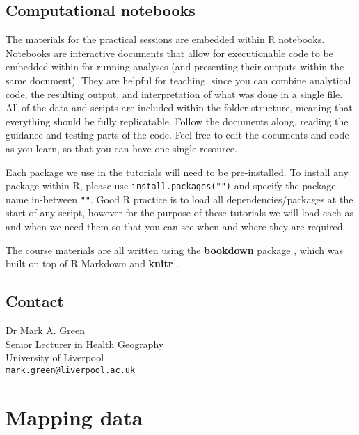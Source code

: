 \documentclass[
]{book}
\begin{document}
\hypertarget{computational-notebooks}{%
\section*{Computational notebooks}\label{computational-notebooks}}

The materials for the practical sessions are embedded within R notebooks. Notebooks are interactive documents that allow for executionable code to be embedded within for running analyses (and presenting their outputs within the same document). They are helpful for teaching, since you can combine analytical code, the resulting output, and interpretation of what was done in a single file. All of the data and scripts are included within the folder structure, meaning that everything should be fully replicatable. Follow the documents along, reading the guidance and testing parts of the code. Feel free to edit the documents and code as you learn, so that you can have one single resource.

Each package we use in the tutorials will need to be pre-installed. To install any package within R, please use \texttt{install.packages("")} and specify the package name in-between \texttt{""}. Good R practice is to load all dependencies/packages at the start of any script, however for the purpose of these tutorials we will load each as and when we need them so that you can see when and where they are required.

The course materials are all written using the \textbf{bookdown} package \citep{R-bookdown}, which was built on top of R Markdown and \textbf{knitr} \citep{xie2015}.

\hypertarget{contact}{%
\section*{Contact}\label{contact}}

Dr Mark A. Green\\
Senior Lecturer in Health Geography\\
University of Liverpool\\
\href{mailto:mark.green@liverpool.ac.uk}{\nolinkurl{mark.green@liverpool.ac.uk}}

\hypertarget{intro}{%
\chapter{Mapping data}\label{intro}}
\end{document}
